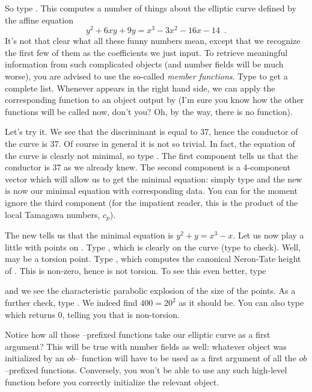 So type . This computes a number of things
about the elliptic curve defined by the affine equation
%
$$ y^2+6xy+9y = x^3-3x^2-16x-14\enspace. $$
%
It's not that clear what all these funny numbers mean, except that we
recognize the first few of them as the coefficients we just input. To
retrieve meaningful information from such complicated objects (and number
fields will be much worse), you are advised to use the so-called \emph{member
functions}. Type  to get a complete list. Whenever  appears
in the right hand side, we can apply the corresponding function to an object
output by  (I'm sure you know how the other  functions
will be called now, don't you? Oh, by the way, there is no 
function).

  Let's try it. We see that the discriminant  is equal to 37,
hence the conductor of the curve is 37. Of course in general it is not so
trivial. In fact, the equation of the curve is clearly not minimal, so type
. The first component  tells us that the
conductor is 37 as we already knew. The second component is a 4-component
vector which will allow us to get the minimal equation: simply type
 and the new  is now our minimal
equation with corresponding data. You can for the moment ignore the third
component  (for the impatient reader, this is the product of the
local Tamagawa numbers, $c_p$).

The new  tells us that the minimal equation is $y^2+y = x^3-x$.
Let us now play a little with points on . Type , which is
clearly on the curve (type  to check). Well, 
may be a torsion point. Type , which computes the
canonical Neron-Tate height of . This is non-zero, hence  is
not torsion. To see this even better, type


\noindent and we see the characteristic parabolic explosion of the size of
the points. As a further check, type
. We indeed find
$400=20^2$ as it should be. You can also type  which
returns 0, telling you that  is non-torsion.

Notice how all those --prefixed functions take our elliptic curve as
a first argument? This will be true with number fields as well: whatever
object was initialized by an $ob$-- function will have to be used as
a first argument of all the $ob$--prefixed functions. Conversely, you won't be
able to use any such high-level function before you correctly initialize the
relevant object. \smallskip

